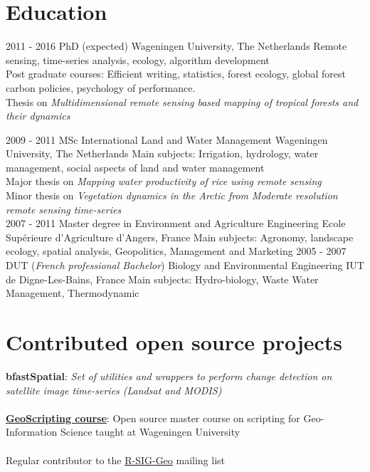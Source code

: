 \documentclass[]{friggeri-cv}
\begin{document}
\section{Education}
\begin{entrylist}
  \entry
    {2011 - 2016}
    {PhD (expected)}
    {Wageningen University, The Netherlands}
    {Remote sensing, time-series analysis, ecology, algorithm development\\
    Post graduate courses: Efficient writing, statistics, forest ecology, global forest carbon policies, psychology of performance.\\
    Thesis on \emph{Multidimensional remote sensing based mapping of tropical forests and their dynamics}\\}

  \entry
    {2009 - 2011}
    {MSc International Land and Water Management}
    {Wageningen University, The Netherlands}
    {Main subjects: Irrigation, hydrology, water management, social aspects of land and water management \\
    Major thesis on \emph{Mapping water productivity of rice using remote sensing}\\
    Minor thesis on \emph{Vegetation dynamics in the Arctic from Moderate resolution remote sensing time-series}\\}
  \entry
    {2007 - 2011}
    {Master degree in Environment and Agriculture Engineering}
    {Ecole Supérieure d'Agriculture d'Angers, France}
    {Main subjects: Agronomy, landscape ecology, spatial analysis, Geopolitics, Management and Marketing}
  \entry
    {2005 - 2007}
    {DUT (\textit{French professional Bachelor}) Biology and Environmental Engineering}
    {IUT de Digne-Les-Bains, France}
    {Main subjects: Hydro-biology, Waste Water Management, Thermodynamic}
\end{entrylist}

\section{Contributed open source projects}
    \textbf{bfastSpatial}: \textit{Set of utilities and wrappers to perform change detection on satellite image time-series (Landsat and MODIS)}\\
    \\
    \href{http://geoscripting-wur.github.io/}{\textbf{GeoScripting course}}: Open source master course on scripting for Geo-Information Science taught at Wageningen University\\
    \\
    Regular contributor to the \href{https://stat.ethz.ch/mailman/listinfo/r-sig-geo}{R-SIG-Geo} mailing list
\end{document}
